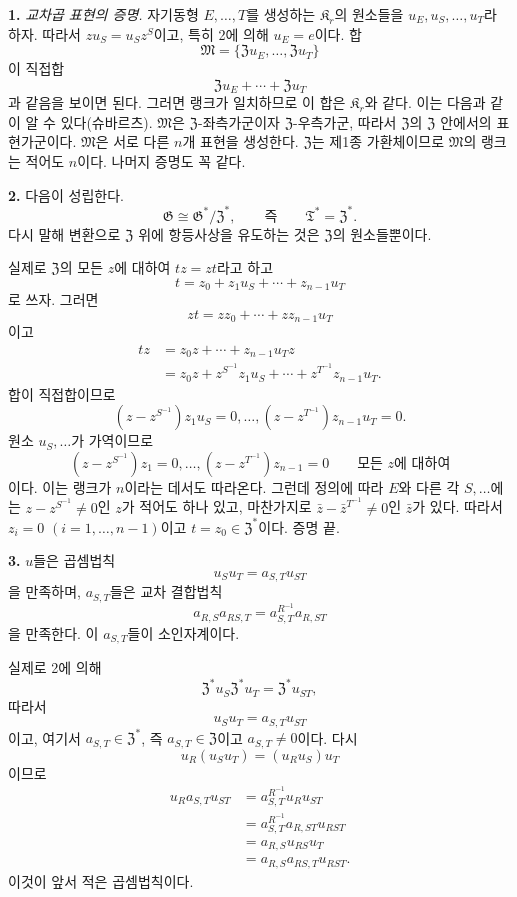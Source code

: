 \noindent\textbf{1.} \emph{교차곱 표현의 증명.} 자기동형 \(E,\ldots,T\)를 생성하는 \(\mathfrak K_r\)의 원소들을 \(u_E,u_S,\ldots,u_T\)라 하자. 따라서 \(zu_S=u_Sz^S\)이고, 특히 2에 의해 \(u_E=e\)이다. 합
\[
        \mathfrak M
        =\{\mathfrak Zu_E,\ldots,\mathfrak Zu_T\}
\]
이 직접합
\[
        \mathfrak Zu_E+\cdots+\mathfrak Zu_T
\]
과 같음을 보이면 된다. 그러면 랭크가 일치하므로 이 합은 \(\mathfrak K_r\)와 같다. 이는 다음과 같이 알 수 있다(슈바르츠). \(\mathfrak M\)은 \(\mathfrak Z\)-좌측가군이자 \(\mathfrak Z\)-우측가군, 따라서 \(\mathfrak Z\)의 \(\mathfrak Z\) 안에서의 표현가군이다. \(\mathfrak M\)은 서로 다른 \(n\)개 표현을 생성한다. \(\mathfrak Z\)는 제1종 가환체이므로 \(\mathfrak M\)의 랭크는 적어도 \(n\)이다. 나머지 증명도 꼭 같다.

\noindent\textbf{2.} 다음이 성립한다.
\[
        \mathfrak G\cong\mathfrak G^*/\mathfrak Z^*,
        \qquad\text{즉}\qquad
        \mathfrak T^*=\mathfrak Z^*.
\]
다시 말해 변환으로 \(\mathfrak Z\) 위에 항등사상을 유도하는 것은 \(\mathfrak Z\)의 원소들뿐이다.

실제로 \(\mathfrak Z\)의 모든 \(z\)에 대하여 \(tz=zt\)라고 하고
\[
        t=z_0+z_1u_S+\cdots+z_{n-1}u_T
\]
로 쓰자. 그러면
\[
        zt=zz_0+\cdots+zz_{n-1}u_T
\]
이고
\[
\begin{aligned}
tz
 &=z_0z+\cdots+z_{n-1}u_Tz\\
 &=z_0z+z^{S^{-1}}z_1u_S+
   \cdots+z^{T^{-1}}z_{n-1}u_T.
\end{aligned}
\]
합이 직접합이므로
\[
        (z-z^{S^{-1}})z_1u_S=0,
        \ldots,
        (z-z^{T^{-1}})z_{n-1}u_T=0.
\]
원소 \(u_S,\ldots\)가 가역이므로
\[
        (z-z^{S^{-1}})z_1=0,
        \ldots,
        (z-z^{T^{-1}})z_{n-1}=0
        \qquad\text{모든 }z\text{에 대하여}
\]
이다. 이는 랭크가 \(n\)이라는 데서도 따라온다. 그런데 정의에 따라 \(E\)와 다른 각 \(S,\ldots\)에는 \(z-z^{S^{-1}}\ne0\)인 \(z\)가 적어도 하나 있고, 마찬가지로 \(\bar z-\bar z^{T^{-1}}\ne0\)인 \(\bar z\)가 있다. 따라서 \(z_i=0\) \((i=1,\ldots,n-1)\)이고 \(t=z_0\in\mathfrak Z^*\)이다. 증명 끝.

\noindent\textbf{3.} \(u\)들은 곱셈법칙
\[
        u_Su_T=a_{S,T}u_{ST}
\]
을 만족하며, \(a_{S,T}\)들은 교차 결합법칙
\[
        a_{R,S}a_{RS,T}
        =a_{S,T}^{R^{-1}}a_{R,ST}
\]
을 만족한다. 이 \(a_{S,T}\)들이 소인자계이다.

실제로 2에 의해
\[
        \mathfrak Z^*u_S\mathfrak Z^*u_T
        =\mathfrak Z^*u_{ST},
\]
따라서
\[
        u_Su_T=a_{S,T}u_{ST}
\]
이고, 여기서 \(a_{S,T}\in\mathfrak Z^*\), 즉 \(a_{S,T}\in\mathfrak Z\)이고 \(a_{S,T}\ne0\)이다. 다시
\[
        u_R(u_Su_T)=(u_Ru_S)u_T
\]
이므로
\[
\begin{aligned}
u_Ra_{S,T}u_{ST}
 &=a_{S,T}^{R^{-1}}u_Ru_{ST}\\
 &=a_{S,T}^{R^{-1}}a_{R,ST}u_{RST}\\
 &=a_{R,S}u_{RS}u_T\\
 &=a_{R,S}a_{RS,T}u_{RST}.
\end{aligned}
\]
이것이 앞서 적은 곱셈법칙이다.

